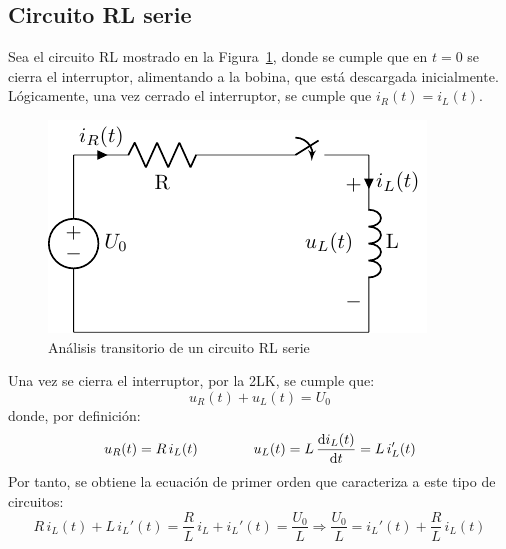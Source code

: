 \documentclass[11pt]{book} %
\begin{document}
	\subsection{Circuito RL serie}
	
	Sea el circuito RL mostrado en la Figura~\ref{fig.transitorio_RL}, donde se cumple que en $t = 0$ se cierra el interruptor, alimentando a la bobina, que está descargada inicialmente. Lógicamente, una vez cerrado el interruptor, se cumple que $i_R(t)=i_L(t)$.  
	\begin{figure}[htbp]
	    \centering
	    \includegraphics{../figs/transitorio_circuitoRL.pdf}
	    \caption{Análisis transitorio de un circuito RL serie}
	    \label{fig.transitorio_RL}
	\end{figure}
	
    Una vez se cierra el interruptor, por la 2LK, se cumple que:
	\begin{equation*}
	    u_R(t) + u_L(t) = U_0
	\end{equation*}
	donde, por definición: 
	\begin{equation*}
	    u_R(t)=R\,i_L(t)\qquad\qquad u_L(t)=L\,\diff{i_L(t)}{t}=L\,i_L'(t)
	\end{equation*}
	Por tanto, se obtiene la ecuación de primer orden que caracteriza a este tipo de circuitos:
	\begin{equation}\label{eq.1orden_L}
	    R\,i_L(t)+L\, i_L'(t)=\dfrac{R}{L}\,i_L+i_L'(t)=\dfrac{U_0}{L}\Rightarrow \boxed{\dfrac{U_0}{L}=i_L'(t)+\dfrac{R}{L}\,i_L(t)}
	\end{equation}
	
\end{document}

